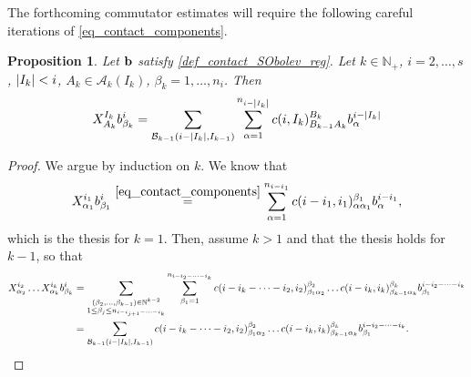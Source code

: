 \documentclass[11pt]{amsart}
\newcommand{\bb}{{\bf {b}}} %
\DeclarePairedDelimiter{\abs}{\lvert}{\rvert}
\theoremstyle{plain}
\newtheorem{proposition}[theorem]{Proposition}
\theoremstyle{definition}
\theoremstyle{remark}
\numberwithin{equation}{section}
\begin{document}
The forthcoming commutator estimates will require the following careful iterations of \eqref{eq_contact_components}.
\begin{proposition}\label{peodneicjecneficnecijn}
 Let $\bb$ satisfy \eqref{def_contact_SObolev_reg}. Let  $k \in \mathbb{N}_+$, $i=2,\dots,s$, $\abs*{I_k} < i$, $A_k \in \mathcal A_k(I_k)$, $\beta_k=1,\dots,n_i$. Then 
\begin{equation} \label{eq_iterated_contact_components}
X^{I_k}_{A_k} b^i_{\beta_k} = \sum_{\mathcal B_{k-1}(i-\abs*{I_k},I_{k-1})} \sum_{\alpha=1}^{n_{i-\abs*{I_k}}} c(i,I_k)_{B_{k-1} A_k}^{B_k} b^{i-\abs*{I_k}}_\alpha
\end{equation}
\end{proposition}
\begin{proof}
We argue by induction on $k$. We know that
\begin{equation*}
X^{i_1}_{\alpha_1} b^i_{\beta_1} \overset{\eqref{eq_contact_components}}{=} \sum_{\alpha=1}^{n_{i-i_1}} c(i-i_1,i_1)^{\beta_1}_{\alpha \alpha_1} b^{i-i_1}_\alpha,
\end{equation*}
which is the thesis for $k=1$. Then, assume $k>1$ and that the thesis holds for $k-1$, so that
\begin{equation*}
\begin{split}
    X^{i_2}_{\alpha_2} \dots X^{i_k}_{\alpha_k} b^i_{\beta_k} & = \sum_{\substack{(\beta_2,\dots,\beta_{k-1}) \in \mathbb{N}^{k-2}\\1 \leq \beta_j \leq n_{i-i_{j+1}-\dots-i_k}}} \sum_{\beta_1=1}^{n_{i-i_2-\dots-i_k}} c(i-i_k-\dots-i_2,i_2)^{\beta_2}_{\beta_1 \alpha_2} \dots c(i-i_k,i_k)^{\beta_k}_{\beta_{k-1} \alpha_k} b^{i-i_2-\dots-i_k}_{\beta_1}\\
    & = \sum_{\mathcal B_{k-1}(i-\abs*{I_k},I_{k-1})} c(i-i_k-\dots-i_2,i_2)^{\beta_2}_{\beta_1 \alpha_2} \dots c(i-i_k,i_k)^{\beta_k}_{\beta_{k-1} \alpha_k} b^{i-i_2-\dots-i_k}_{\beta_1}.
\end{split}
\end{equation*}

\end{proof}
\end{document}
